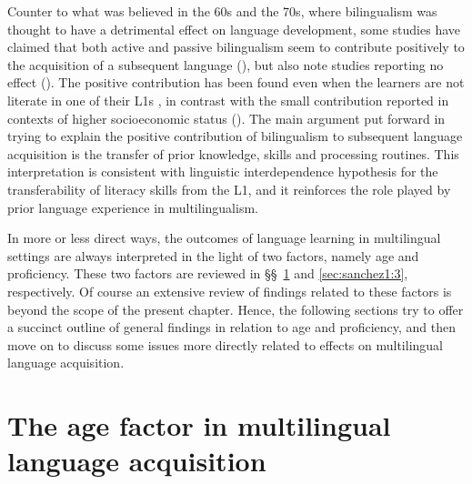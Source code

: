 \documentclass[output=paper]{../langscibook}
\begin{document}
Counter to what was believed in the 60s and the 70s, where bilingualism was thought to have a detrimental effect on language development, some studies have claimed that both active and passive bilingualism seem to contribute positively to the acquisition of a subsequent language (\citealt{CenozValencia1994, Muñoz2000, Sanz2000, Brohy2001}), but also note studies reporting no effect (\citealt{JaspaertLemmens1990, SandersMeijers1995}). The positive contribution has been found even when the learners are not literate in one of their L1s \citep{WagnerEtAl1989}, in contrast with the small contribution reported in contexts of higher socioeconomic status (\citealt{BenmamounEtAl2013, Polinsky2015}). The main argument put forward in trying to explain the positive contribution of bilingualism to subsequent language acquisition is the transfer of prior knowledge, skills and processing routines. This interpretation is consistent with  linguistic interdependence hypothesis for the transferability of literacy skills from the L1, and it reinforces the role played by prior language experience in multilingualism.

In more or less direct ways, the outcomes of language learning in multilingual settings are always interpreted in the light of two factors, namely age and proficiency. These two factors are reviewed in §§~\ref{sec:sanchez1:2} and \ref{sec:sanchez1:3}, respectively. Of course an extensive review of findings related to these factors is beyond the scope of the present chapter. Hence, the following sections try to offer a succinct outline of general findings in relation to age and proficiency, and then move on to discuss some issues more directly related to effects on multilingual language acquisition.

\section{The age factor in multilingual language acquisition}\label{sec:sanchez1:2}
\end{document}
